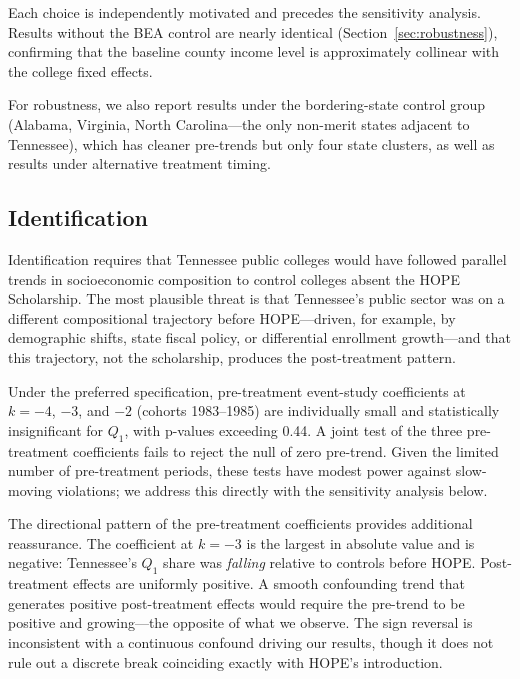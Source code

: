 Each choice is independently motivated and precedes the sensitivity
analysis. Results without the BEA control are nearly identical
(Section~\ref{sec:robustness}), confirming that the baseline county
income level is approximately collinear with the college fixed
effects.

For robustness, we also report results under the bordering-state
control group (Alabama, Virginia, North Carolina---the only non-merit
states adjacent to Tennessee), which has cleaner pre-trends but only
four state clusters, as well as results under alternative treatment
timing.

\subsection{Identification}

Identification requires that Tennessee public colleges would have
followed parallel trends in socioeconomic composition to control
colleges absent the HOPE Scholarship. The most plausible threat is
that Tennessee's public sector was on a different compositional
trajectory before HOPE---driven, for example, by demographic shifts,
state fiscal policy, or differential enrollment growth---and that
this trajectory, not the scholarship, produces the post-treatment
pattern.

Under the preferred specification, pre-treatment event-study
coefficients at $k = -4$, $-3$, and $-2$ (cohorts 1983--1985) are
individually small and statistically insignificant for $Q_1$, with
p-values exceeding 0.44. A joint test of the three pre-treatment
coefficients fails to reject the null of zero pre-trend. Given the
limited number of pre-treatment periods, these tests have modest
power against slow-moving violations; we address this directly with
the \textcite{rambachan2023more} sensitivity analysis below.

The directional pattern of the pre-treatment coefficients provides
additional reassurance. The coefficient at $k = -3$ is the largest
in absolute value and is negative: Tennessee's $Q_1$ share was
\emph{falling} relative to controls before HOPE. Post-treatment
effects are uniformly positive. A smooth confounding trend that
generates positive post-treatment effects would require the pre-trend
to be positive and growing---the opposite of what we observe. The
sign reversal is inconsistent with a continuous confound driving our
results, though it does not rule out a discrete break coinciding
exactly with HOPE's introduction.

